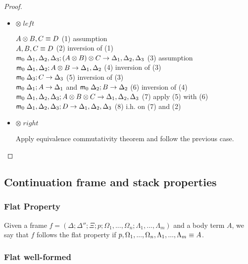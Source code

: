 \begin{proof}
\begin{itemize}
      \item $\otimes \; left$
      
      $A \otimes B, C \equiv D$ \hfill (1) assumption \\
      $A, B, C \equiv D$ \hfill (2) inversion of (1) \\
      $\mathsf{m}_0 \; \Delta_1, \Delta_2, \Delta_3; (A \otimes B) \otimes C \rightarrow \Delta_1, \Delta_2, \Delta_3$ \hfill (3) assumption \\
      $\mathsf{m}_0 \; \Delta_1, \Delta_2; A \otimes B \rightarrow \Delta_1, \Delta_2$ \hfill (4) inversion of (3) \\
      $\mathsf{m}_0 \; \Delta_3; C \rightarrow \Delta_3$ \hfill (5) inversion of (3) \\
      $\mathsf{m}_0 \; \Delta_1; A \rightarrow \Delta_1$ and $\mathsf{m}_0 \; \Delta_2; B \rightarrow \Delta_2$ \hfill (6) inversion of (4) \\
      $\mathsf{m}_0 \; \Delta_1, \Delta_2, \Delta_3; A \otimes B \otimes C \rightarrow \Delta_1, \Delta_2, \Delta_3$ \hfill (7) apply (5) with (6) \\
      $\mathsf{m}_0 \; \Delta_1, \Delta_2, \Delta_3; D \rightarrow \Delta_1, \Delta_2, \Delta_3$ \hfill (8) i.h. on (7) and (2)\\
      
      \item $\otimes \; right$
      
      Apply equivalence commutativity theorem and follow the previous case.
   \end{itemize}
\end{proof}

\subsection{Continuation frame and stack properties}

\subsubsection{Flat Property}

Given a frame $f = (\Delta; \Delta''; \Xi; p; \Omega_1, ..., \Omega_n; \Lambda_1, ..., \Lambda_m)$ and a body term $A$, we say that $f$ follows the flat property if $p, \Omega_1, ..., \Omega_n, \Lambda_1, ..., \Lambda_m \equiv A$.

\subsubsection{Flat well-formed}

